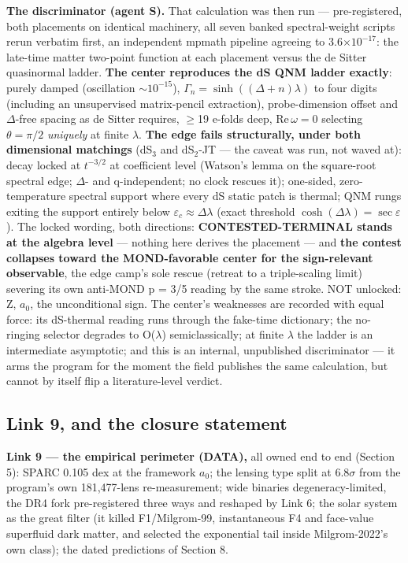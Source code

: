 \documentclass[11pt,a4paper]{article}
\begin{document}
\textbf{The discriminator (agent S).} That calculation was then run --- pre-registered, both placements on identical machinery, all seven banked spectral-weight scripts rerun verbatim first, an independent mpmath pipeline agreeing to 3.6$\times10^{-17}$: the late-time matter two-point function at each placement versus the de Sitter quasinormal ladder. \textbf{The center reproduces the dS QNM ladder exactly}: purely damped (oscillation $\sim{}10^{-15}$), $\Gamma_n = \sinh((\Delta+n)\lambda)$ to four digits (including an unsupervised matrix-pencil extraction), probe-dimension offset and $\Delta$-free spacing as de Sitter requires, $\ge$19 e-folds deep, $\mathrm{Re}\,\omega = 0$ selecting $\theta = \pi/2$ \emph{uniquely} at finite $\lambda$. \textbf{The edge fails structurally, under both dimensional matchings} (dS$_3$ and dS$_2$-JT --- the caveat was run, not waved at): decay locked at $t^{-3/2}$ at coefficient level (Watson's lemma on the square-root spectral edge; $\Delta$- and q-independent; no clock rescues it); one-sided, zero-temperature spectral support where every dS static patch is thermal; QNM rungs exiting the support entirely below $\varepsilon_c \approx \Delta\lambda$ (exact threshold $\cosh(\Delta\lambda) = \sec\varepsilon$). The locked wording, both directions: \textbf{CONTESTED-TERMINAL stands at the algebra level} --- nothing here derives the placement --- and \textbf{the contest collapses toward the MOND-favorable center for the sign-relevant observable}, the edge camp's sole rescue (retreat to a triple-scaling limit) severing its own anti-MOND p = 3/5 reading by the same stroke. NOT unlocked: Z, $a_{0}$, the unconditional sign. The center's weaknesses are recorded with equal force: its dS-thermal reading runs through the fake-time dictionary; the no-ringing selector degrades to O($\lambda$) semiclassically; at finite $\lambda$ the ladder is an intermediate asymptotic; and this is an internal, unpublished discriminator --- it arms the program for the moment the field publishes the same calculation, but cannot by itself flip a literature-level verdict.

\subsection{Link 9, and the closure statement}

\textbf{Link 9 --- the empirical perimeter (DATA),} all owned end to end (Section 5): SPARC 0.105 dex at the framework $a_{0}$; the lensing type split at $6.8\sigma$ from the program's own 181,477-lens re-measurement; wide binaries degeneracy-limited, the DR4 fork pre-registered three ways and reshaped by Link 6; the solar system as the great filter (it killed F1/Milgrom-99, instantaneous F4 and face-value superfluid dark matter, and selected the exponential tail inside Milgrom-2022's own class); the dated predictions of Section 8.
\end{document}
